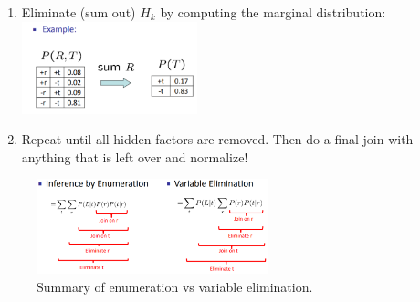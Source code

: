 \documentclass[11pt]{article}
\begin{document}
\begin{itemize}
\begin{enumerate}
        \item Eliminate (sum out) $H_k$ by computing the marginal distribution:\\
        \includegraphics[width=0.4\textwidth]{figs/marginalize.png}
        \item Repeat until all hidden factors are removed. Then do a final join with anything that is left over and normalize!
    \end{enumerate}
    \begin{figure}[ht]
        \centering
        \includegraphics[width=0.6\textwidth]{figs/enumvselim.png}
        \caption{Summary of enumeration vs variable elimination.}
        \label{fig:enumvselim}
    \end{figure}
\end{itemize}
\end{document}
